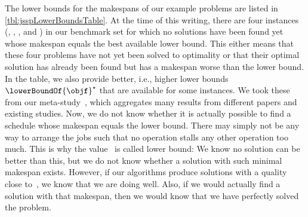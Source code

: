 The lower bounds for the makespans of our example problems are listed in \cref{tbl:jsspLowerBoundsTable}.
At the time of this writing, there are four instances (, , , and ) in our benchmark set for which no solutions have been found yet whose makespan equals the best available lower bound.
This either means that these four problems have not yet been solved to optimality or that their optimal solution has already been found but has a makespan worse than the lower bound.
In the table, we also provide better, i.e., higher lower bounds~$\lowerBoundOf{\objf}^{\star}$ that are available for some instances.
We took these from our meta-study~\cite{W2019JRDAIOTJSSP}, which aggregates many results from different papers and existing studies.
%
\endhsection%
%
%
Now, we do not know whether it is actually possible to find a schedule whose makespan equals the lower bound.
There may simply not be any way to arrange the jobs such that no operation stalls any other operation too much.
This is why the value~\lowerBoundOf{\objf} is called lower bound:
We know no solution can be better than this, but we do not know whether a solution with such minimal makespan exists.
However, if our algorithms produce solutions with a quality close to~\lowerBoundOf{\objf}, we know that we are doing well.
Also, if we would actually find a solution with that makespan, then we would know that we have perfectly solved the problem.
\endhsection%
\endhsection%
%
